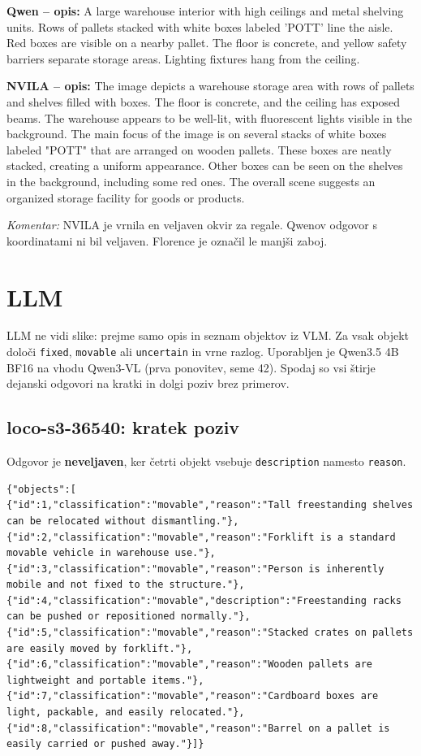 \documentclass[11pt,a4paper]{article}
\begin{document}
\textbf{Qwen -- opis:} A large warehouse interior with high ceilings and metal shelving units. Rows of pallets stacked with white boxes labeled 'POTT' line the aisle. Red boxes are visible on a nearby pallet. The floor is concrete, and yellow safety barriers separate storage areas. Lighting fixtures hang from the ceiling.

\textbf{NVILA -- opis:} The image depicts a warehouse storage area with rows of pallets and shelves filled with boxes. The floor is concrete, and the ceiling has exposed beams. The warehouse appears to be well-lit, with fluorescent lights visible in the background. The main focus of the image is on several stacks of white boxes labeled "POTT" that are arranged on wooden pallets. These boxes are neatly stacked, creating a uniform appearance. Other boxes can be seen on the shelves in the background, including some red ones. The overall scene suggests an organized storage facility for goods or products.

\textit{Komentar:} NVILA je vrnila en veljaven okvir za regale. Qwenov odgovor s koordinatami ni bil veljaven. Florence je označil le manjši zaboj.

\clearpage
\section{LLM}
LLM ne vidi slike: prejme samo opis in seznam objektov iz VLM. Za vsak objekt določi \texttt{fixed}, \texttt{movable} ali \texttt{uncertain} in vrne razlog. Uporabljen je Qwen3.5 4B BF16 na vhodu Qwen3-VL (prva ponovitev, seme 42). Spodaj so vsi štirje dejanski odgovori na kratki in dolgi poziv brez primerov.

\subsection{loco-s3-36540: kratek poziv}
Odgovor je \textbf{neveljaven}, ker četrti objekt vsebuje \texttt{description} namesto \texttt{reason}.
\begin{lstlisting}
{"objects":[
{"id":1,"classification":"movable","reason":"Tall freestanding shelves can be relocated without dismantling."},
{"id":2,"classification":"movable","reason":"Forklift is a standard movable vehicle in warehouse use."},
{"id":3,"classification":"movable","reason":"Person is inherently mobile and not fixed to the structure."},
{"id":4,"classification":"movable","description":"Freestanding racks can be pushed or repositioned normally."},
{"id":5,"classification":"movable","reason":"Stacked crates on pallets are easily moved by forklift."},
{"id":6,"classification":"movable","reason":"Wooden pallets are lightweight and portable items."},
{"id":7,"classification":"movable","reason":"Cardboard boxes are light, packable, and easily relocated."},
{"id":8,"classification":"movable","reason":"Barrel on a pallet is easily carried or pushed away."}]}
\end{lstlisting}
\end{document}
